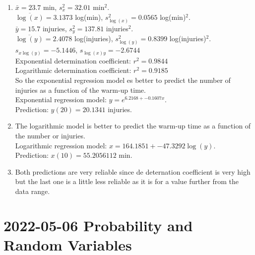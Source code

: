 \documentclass[
  a4paper,
]{scrreport}
\theoremstyle{definition}
\theoremstyle{remark}
\begin{document}
\begin{tcolorbox}
\begin{enumerate}
\def\labelenumi{\alph{enumi}.}
\item
  \(\bar x=23.7\) min, \(s_x^2=32.01\) min\(^2\).\\
  \(\overline{\log(x)}=3.1373\) log(min), \(s_{\log(x)}^2=0.0565\)
  log(min)\(^2\).\\
  \(\bar y=15.7\) injuries, \(s_y^2=137.81\) injuries\(^2\).\\
  \(\overline{\log(y)}=2.4078\) log(injuries), \(s_{\log(y)}^2=0.8399\)
  log(injuries)\(^2\).\\
  \(s_{x\log(y)}=-5.1446\), \(s_{\log(x)y}=-2.6744\)\\
  Exponential determination coefficient: \(r^2=0.9844\)\\
  Logarithmic determination coefficient: \(r^2=0.9185\)\\
  So the exponential regression model es better to predict the number of
  injuries as a function of the warm-up time.\\
  Exponential regression model: \(y=e^{6.2168+-0.1607x}\).\\
  Prediction: \(y(20)=20.1341\) injuries.
\item
  The logarithmic model is better to predict the warm-up time as a
  function of the number or injuries.\\
  Logarithmic regression model: \(x=164.1851+-47.3292\log(y)\).\\
  Prediction: \(x(10)=55.2056112\) min.
\item
  Both predictions are very reliable since de deternation coefficient is
  very high but the last one is a little less reliable as it is for a
  value further from the data range.
\end{enumerate}

\end{tcolorbox}


\hypertarget{probability-and-random-variables}{%
\chapter{\texorpdfstring{2022-05-06 Probability and Random
Variables}{2022-05-06  Probability and Random Variables}}\label{probability-and-random-variables}}
\end{document}
